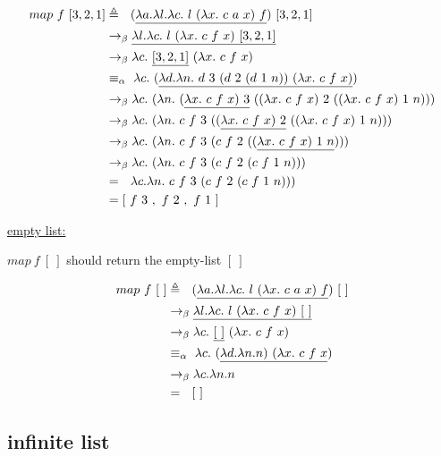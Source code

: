 \documentclass{article}
\begin{document}
\begin{Large}
		\begin{align*}
			map \ f \ [3,2,1] &\triangleq \saq (\underline{\la a.\la l.\la c. \ l \ (\la x.\ c \ a \ x) \ f}) \ [3,2,1] \\
			&\equals \underline{\la l.\la c. \ l \ (\la x.\ c \ f \ x) \ [3,2,1]} \\
			&\equals \la c. \ \underline{[3,2,1]} \ (\la x.\ c \ f \ x) \\
			&\equiv_\alpha \, \, \la c. \  (\underline{\la d.\la n. \ d \ 3 \ (d \ 2 \ (d \ 1 \ n)) \ (\la x.\ c \ f \ x)}) \\
			&\equals \la c. \  (\la n. \ (\underline{\la x.\ c \ f \ x) \ 3} \ ((\la x.\ c \ f \ x) \ 2 \ ((\la x.\ c \ f \ x) \ 1 \ n))) \\
			&\equals \la c. \  (\la n. \ c\ f \ 3 \ ((\underline{\la x.\ c \ f \ x) \ 2} \ ((\la x.\ c \ f \ x) \ 1 \ n))) \\
			&\equals \la c. \  (\la n. \ c\ f \ 3 \ (c \ f \ 2 \ ((\underline{\la x.\ c \ f \ x) \ 1 \ n}))) \\
			&\equals \la c. \  (\la n. \ c\ f \ 3 \ (c \ f \ 2 \ (c \ f \ 1 \ n))) \\
			&= \saq \la c.\la n. \ c\ f \ 3 \ (c \ f \ 2 \ (c \ f \ 1 \ n))) \\
			&= [\ f \ 3 \ , \ f \ 2 \ , \  f \ 1\ ]
		\end{align*}
		
		\underline{empty list:}
		\newline
		
		$map \ f \ [ \ ]$ should return the empty-list $[ \ ]$
		
		\begin{align*}
			map \ f \ [ \ ] &\triangleq \saq (\underline{\la a.\la l.\la c. \ l \ (\la x.\ c \ a \ x) \ f}) \ [ \ ] \\
			&\equals \underline{\la l.\la c. \ l \ (\la x.\ c \ f \ x) \ [ \ ]} \\
			&\equals \la c. \ \underline{[ \ ]} \ (\la x.\ c \ f \ x) \\
			&\equiv_\alpha \, \, \la c. \ (\underline{\la d.\la n.n) \ (\la x.\ c \ f \ x}) \\
			&\equals \la c.\la n.n \\
			&= \saq [ \ ]
		\end{align*}
		\newpage
		
		
		
	\subsection{infinite list}
		

\end{Large}
\end{document}
